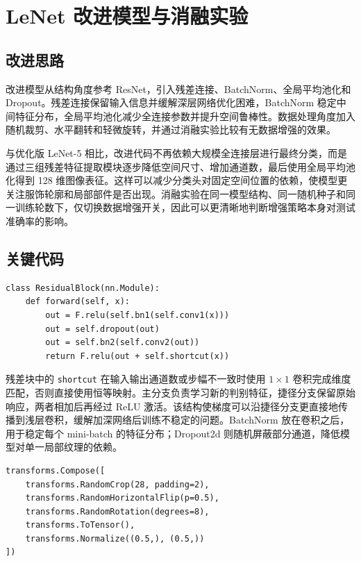 \documentclass[UTF8]{ctexart}
\begin{document}
\section{LeNet 改进模型与消融实验}

\subsection{改进思路}

改进模型从结构角度参考 ResNet，引入残差连接、BatchNorm、全局平均池化和 Dropout。残差连接保留输入信息并缓解深层网络优化困难，BatchNorm 稳定中间特征分布，全局平均池化减少全连接参数并提升空间鲁棒性。数据处理角度加入随机裁剪、水平翻转和轻微旋转，并通过消融实验比较有无数据增强的效果。

与优化版 LeNet-5 相比，改进代码不再依赖大规模全连接层进行最终分类，而是通过三组残差特征提取模块逐步降低空间尺寸、增加通道数，最后使用全局平均池化得到 128 维图像表征。这样可以减少分类头对固定空间位置的依赖，使模型更关注服饰轮廓和局部部件是否出现。消融实验在同一模型结构、同一随机种子和同一训练轮数下，仅切换数据增强开关，因此可以更清晰地判断增强策略本身对测试准确率的影响。

\subsection{关键代码}

\begin{lstlisting}[caption={残差块核心实现}]
class ResidualBlock(nn.Module):
    def forward(self, x):
        out = F.relu(self.bn1(self.conv1(x)))
        out = self.dropout(out)
        out = self.bn2(self.conv2(out))
        return F.relu(out + self.shortcut(x))
\end{lstlisting}

残差块中的 \texttt{shortcut} 在输入输出通道数或步幅不一致时使用 $1\times1$ 卷积完成维度匹配，否则直接使用恒等映射。主分支负责学习新的判别特征，捷径分支保留原始响应，两者相加后再经过 ReLU 激活。该结构使梯度可以沿捷径分支更直接地传播到浅层卷积，缓解加深网络后训练不稳定的问题。BatchNorm 放在卷积之后，用于稳定每个 mini-batch 的特征分布；Dropout2d 则随机屏蔽部分通道，降低模型对单一局部纹理的依赖。

\begin{lstlisting}[caption={数据增强配置}]
transforms.Compose([
    transforms.RandomCrop(28, padding=2),
    transforms.RandomHorizontalFlip(p=0.5),
    transforms.RandomRotation(degrees=8),
    transforms.ToTensor(),
    transforms.Normalize((0.5,), (0.5,))
])
\end{lstlisting}
\end{document}
